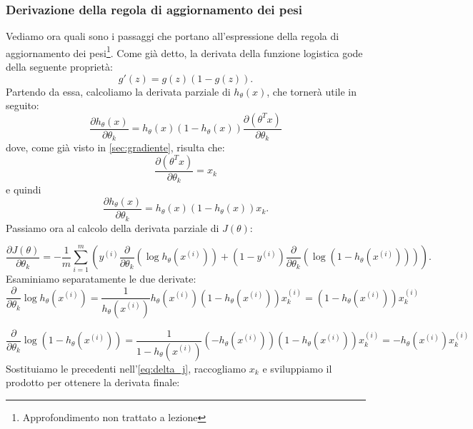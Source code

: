 \subsubsection{Derivazione della regola di aggiornamento dei pesi}\label{sec:dim_log_regr}
Vediamo ora quali sono i passaggi che portano all'espressione della regola di aggiornamento dei pesi\footnote{Approfondimento non trattato a lezione}. Come già detto, la derivata della funzione logistica gode della seguente proprietà:
\begin{equation*}
g'(z) =g(z)(1-g(z)).
\end{equation*}
Partendo da essa, calcoliamo la derivata parziale di $h_\theta(x)$, che tornerà utile in seguito:
\begin{equation*}
\frac{\partial h_\theta(x)}{\partial \theta_k} = h_\theta(x) (1-h_\theta(x)) \frac{\partial (\theta^T x)}{\partial \theta_k}
\end{equation*}
dove, come già visto in \autoref{sec:gradiente}, risulta che:
\begin{equation*}
\frac{\partial (\theta^T x)}{\partial \theta_k} = x_k
\end{equation*}
e quindi
\begin{equation*}
\frac{\partial h_\theta(x)}{\partial \theta_k} = h_\theta(x) (1-h_\theta(x)) x_k.
\end{equation*}
Passiamo ora al calcolo della derivata parziale di $J(\theta)$:

 \begin{equation}\label{eq:delta_j}
 \frac{\partial J(\theta)}{\partial \theta_k} = -\frac{1}{m}\sum_{i=1}^m \left( {y^{(i)}} \frac{\partial}{\partial \theta_k}(\log{h_\theta(x^{(i)})}) + (1-y^{(i)})
 \frac{\partial}{\partial \theta_k}(\log{(1 - h_\theta(x^{(i)}))}) \right).
\end{equation}
Esaminiamo separatamente le due derivate:
\begin{equation*}
\frac{\partial}{\partial \theta_k}\log{h_\theta(x^{(i)})} = \frac{1}{h_\theta(x^{(i)})} h_\theta(x^{(i)}) (1-h_\theta(x^{(i)})) x_k^{(i)} =  (1-h_\theta(x^{(i)})) x_k^{(i)}
\end{equation*}

\begin{equation*}
\frac{\partial}{\partial \theta_k}\log{(1 - h_\theta(x^{(i)}))} = \frac{1}{1- h_\theta(x^{(i)})} (-h_\theta(x^{(i)})) (1-h_\theta(x^{(i)})) x_k^{(i)} =  -h_\theta(x^{(i)}) x_k^{(i)}
\end{equation*}
Sostituiamo le precedenti nell'\autoref{eq:delta_j}, raccogliamo $x_k$ e sviluppiamo il prodotto per ottenere la derivata finale:


